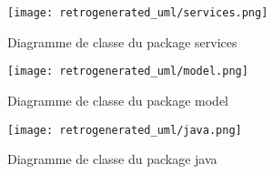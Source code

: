 \begin{figure}[h!]
    		\begin{center}
      			\texttt{[image: retrogenerated\_uml/services.png]}
      			\caption{Diagramme de classe du package services}
    		\end{center}
  	\end{figure}
\begin{figure}[h!]
    		\begin{center}
      			\texttt{[image: retrogenerated\_uml/model.png]}
      			\caption{Diagramme de classe du package model}
    		\end{center}
  	\end{figure}
\begin{figure}[h!]
    		\begin{center}
      			\texttt{[image: retrogenerated\_uml/java.png]}
      			\caption{Diagramme de classe du package java}
    		\end{center}
  	\end{figure}
